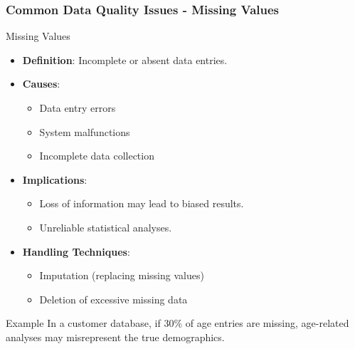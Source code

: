 \documentclass{beamer}
\begin{document}
\begin{frame}[fragile]
    \frametitle{Common Data Quality Issues - Missing Values}
    \begin{block}{Missing Values}
        \begin{itemize}
            \item \textbf{Definition}: Incomplete or absent data entries.
            \item \textbf{Causes}:
                \begin{itemize}
                    \item Data entry errors
                    \item System malfunctions
                    \item Incomplete data collection
                \end{itemize}
            \item \textbf{Implications}:
                \begin{itemize}
                    \item Loss of information may lead to biased results.
                    \item Unreliable statistical analyses.
                \end{itemize}
            \item \textbf{Handling Techniques}:
                \begin{itemize}
                    \item Imputation (replacing missing values)
                    \item Deletion of excessive missing data
                \end{itemize}
        \end{itemize}
    \end{block}
    \begin{exampleblock}{Example}
        In a customer database, if 30\% of age entries are missing, age-related analyses may misrepresent the true demographics.
    \end{exampleblock}
\end{frame}
\end{document}
